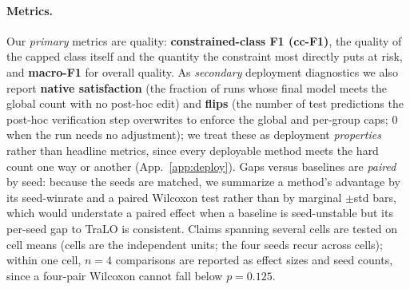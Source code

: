 \documentclass[10pt]{article}
\begin{document}
\paragraph{Metrics.}
Our \emph{primary} metrics are quality: \textbf{constrained-class F1
(cc-F1)}, the quality of the capped class itself and the quantity the
constraint most directly puts at risk, and \textbf{macro-F1} for overall
quality. As \emph{secondary} deployment diagnostics we also report
\textbf{native satisfaction} (the fraction of runs whose final model meets
the global count with no post-hoc edit) and \textbf{flips} (the number of
test predictions the post-hoc verification step overwrites to enforce the
global and per-group caps; $0$ when the run needs no adjustment); we treat
these as deployment \emph{properties} rather than headline metrics, since
every deployable method meets the hard count one way or another
(App.~\ref{app:deploy}). Gaps versus baselines are \emph{paired} by seed:
because the seeds are matched, we summarize a method's advantage by its
seed-winrate and a paired Wilcoxon test rather than by marginal $\pm$std
bars, which would understate a paired effect when a baseline is
seed-unstable but its per-seed gap to TraLO is consistent. Claims spanning
several cells are tested on cell means (cells are the independent units;
the four seeds recur across cells); within one cell, $n{=}4$ comparisons
are reported as effect sizes and seed counts, since a four-pair Wilcoxon
cannot fall below $p{=}0.125$.
\end{document}
